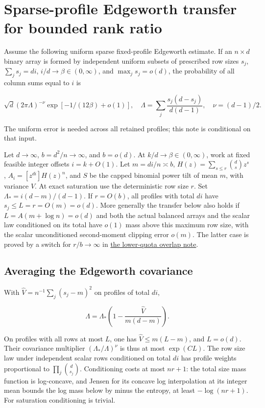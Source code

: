 \section{Sparse-profile Edgeworth transfer for bounded rank ratio}\label{sec:edgeworth-bounded-rank-ratio}

Assume the following uniform sparse fixed-profile Edgeworth estimate. If an $n\times d$ binary array is formed by independent uniform subsets of prescribed row sizes $s_j$, $\sum_j s_j=di$, $i/d\to\beta\in(0,\infty)$, and $\max_j s_j=o(d)$, the probability of all column sums equal to $i$ is

\begin{equation*}
\sqrt d(2\pi\Lambda)^{-\nu}\exp[-1/(12\beta)+o(1)],
\quad \Lambda=\sum_j\frac{s_j(d-s_j)}{d(d-1)},\quad\nu=(d-1)/2.
\end{equation*}

The uniform error is needed across all retained profiles; this note is conditional on that input.

Let $d\to\infty$, $b=d^2/n\to\infty$, and $b=o(d)$. At $k/d\to\beta\in(0,\infty)$, work at fixed feasible integer offsets $i=k+O(1)$. Let $m=di/n\asymp b$, $H(z)=\sum_{s\le r}\binom ds z^s$, $A_i=[z^{di}]H(z)^n$, and $S$ be the capped binomial power tilt of mean $m$, with variance $V$. At exact saturation use the deterministic row size $r$. Set $\Lambda_*=i(d-m)/(d-1)$. If $r=O(b)$, all profiles with total $di$ have $s_j\le L=r=O(m)=o(d)$. More generally the transfer below also holds if $L=A(m+\log n)=o(d)$ and both the actual balanced arrays and the scalar law conditioned on its total have $o(1)$ mass above this maximum row size, with the scalar unconditioned second-moment clipping error $o(m)$. The latter case is proved by a switch for $r/b\to\infty$ in \hyperref[sec:edgeworth-finite-lower-overlap]{the lower-quota overlap note}.

\subsection{Averaging the Edgeworth covariance}

With $\widehat V=n^{-1}\sum_j(s_j-m)^2$ on profiles of total $di$,

\begin{equation*}
\Lambda=\Lambda_*\left(1-\frac{\widehat V}{m(d-m)}\right).
\end{equation*}

On profiles with all rows at most $L$, one has $\widehat V\le m(L-m)$, and $L=o(d)$. Their covariance multiplier $(\Lambda_*/\Lambda)^\nu$ is thus at most $\exp(CL)$. The row size law under independent scalar rows conditioned on total $di$ has profile weights proportional to $\prod_j\binom d{s_j}$. Conditioning costs at most $nr+1$: the total size mass function is log-concave, and Jensen for its concave log interpolation at its integer mean bounds the log mass below by minus the entropy, at least $-\log(nr+1)$. For saturation conditioning is trivial.


